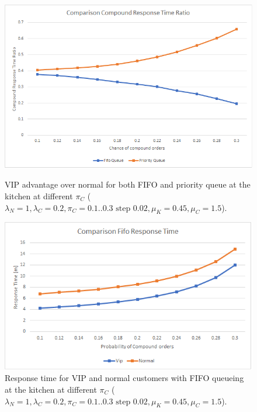 \begin{figure}[h!]
    \centering
    \begin{minipage}{0.48\textwidth}
      \includegraphics[width=\textwidth]{figs/comparisonQueue.png}
      \caption{VIP advantage over normal for both FIFO and priority queue at the kitchen at different $\pi_C$ ($\lambda_N=1,\lambda_C=0.2,\pi_C={{0.1..0.3 \text{ step } 0.02}}, \mu_K=0.45, \mu_C=1.5$).}
      \label{}
    \end{minipage}\hspace{0.03\textwidth}
    \begin{minipage}{0.48\textwidth}
      \includegraphics[width=\textwidth]{figs/comparisonFifoKitchen.png}
      \caption{Response time for VIP and normal customers with FIFO queueing at the kitchen at different $\pi_C$ ($\lambda_N=1,\lambda_C=0.2,\pi_C={{0.1..0.3 \text{ step } 0.02}}, \mu_K=0.45, \mu_C=1.5$).}
      \label{fig:fifokitchen-constant}
    \end{minipage}
\end{figure}

